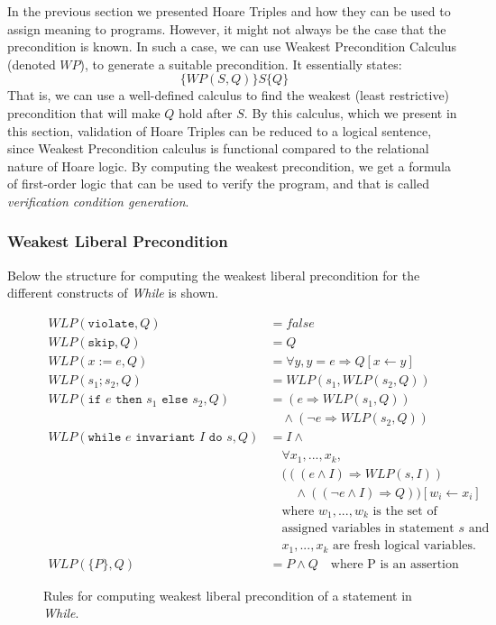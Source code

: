 In the previous section we presented Hoare Triples and how they can be used to assign meaning to programs. 
However, it might not always be the case that the precondition is known. 
In such a case, we can use Weakest Precondition Calculus (denoted $WP$), to generate a suitable precondition.
It essentially states:
$$
 \{WP(S,Q)\}S\{Q\}
$$
That is, we can use a well-defined calculus to find the weakest (least restrictive) precondition that will make $Q$ hold after $S$. By this calculus, which we present in this section, validation of Hoare Triples can be reduced to a logical sentence, since Weakest Precondition calculus is functional compared to the relational nature of Hoare logic.
By computing the weakest precondition, we get a formula of first-order logic that can be used to verify the program, and that is called \textit{verification condition generation}.

\subsubsection{Weakest Liberal Precondition}
Below the structure for computing the weakest liberal precondition for the different constructs of \textit{While} is shown.

\begin{figure}
\begin{align*}
	WLP(\texttt{violate}, Q) &= false \\
	WLP(\texttt{skip}, Q) &= Q \\
	WLP(x:=e,Q) &= \forall y, y = e \Rightarrow Q[x \leftarrow y] \\
	WLP(s_1;s_2, Q) &= WLP(s_1, WLP(s_2, Q)) \\
	WLP(\texttt{if } e \texttt{ then } s_1 \texttt{ else } s_2, Q) &= (e \Rightarrow WLP(s_1, Q)) \\
		&\quad \land (\neg e \Rightarrow WLP(s_2, Q)) \\
	WLP(\texttt{while } e \texttt{ invariant } I \texttt{ do } s, Q) &= 
		I \land \\
    &\quad \forall x_1, ..., x_k, \\
    &\quad (((e \land I) \Rightarrow WLP(s, I)) \\
    &\quad \quad \land (( \neg e \land I) \Rightarrow Q))
       [w_i \leftarrow x_i] \\
	&\quad \text{where } w_1, ..., w_k \text{ is the set of} \\
  &\quad \text{assigned variables in statement } s \text{ and } \\
	&\quad x_1, ..., x_k \text{ are fresh logical variables.} \\
  WLP(\{P\}, Q) &= P \land Q \quad \text{where P is an assertion}
\end{align*}
\caption{Rules for computing weakest liberal precondition of a statement in \textit{While}.}
\label{fig:wlp}
\end{figure}

